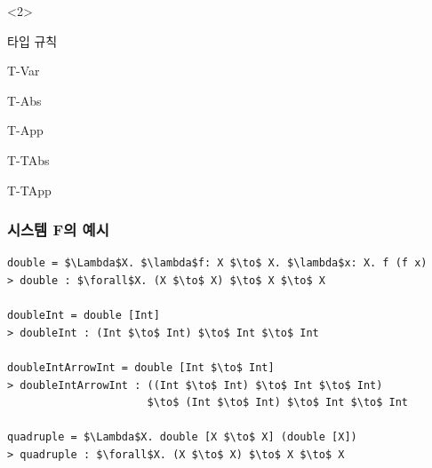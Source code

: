 \documentclass{beamer}
\begin{document}
\begin{frame}[c, fragile]
\begin{onlyenv}
\begin{minipage}[t]{0.49\linewidth}
    \end{minipage}
  \end{onlyenv}
  \begin{onlyenv}<2>
    \begin{minipage}[t]{0.49\linewidth}
      타입 규칙\hfill{}
      \begin{center}
        \begin{InfRule}{T-Var}
        \end{InfRule}
        \begin{InfRule}{T-Abs}
        \end{InfRule}
        \begin{InfRule}{T-App}
        \end{InfRule}
        \begin{InfRule}{T-TAbs}
        \end{InfRule}
        \begin{InfRule}{T-TApp}
        \end{InfRule}
      \end{center}
    \end{minipage}
  \end{onlyenv}
\end{frame}


\begin{frame}[c, fragile]
  \frametitle{시스템 F의 예시}

\begin{lstlisting}
double = $\Lambda$X. $\lambda$f: X $\to$ X. $\lambda$x: X. f (f x)
> double : $\forall$X. (X $\to$ X) $\to$ X $\to$ X

doubleInt = double [Int]
> doubleInt : (Int $\to$ Int) $\to$ Int $\to$ Int

doubleIntArrowInt = double [Int $\to$ Int]
> doubleIntArrowInt : ((Int $\to$ Int) $\to$ Int $\to$ Int)
                      $\to$ (Int $\to$ Int) $\to$ Int $\to$ Int

quadruple = $\Lambda$X. double [X $\to$ X] (double [X])
> quadruple : $\forall$X. (X $\to$ X) $\to$ X $\to$ X
\end{lstlisting}
\end{frame}
\end{document}
